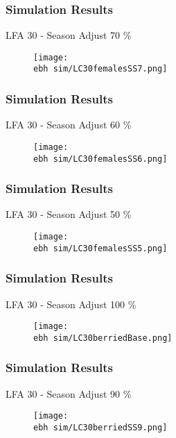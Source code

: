 \documentclass{beamer}
\newcommand{\ebh}{\string~/bio.data/bio.lobster/figures/LFA2733Framework2018/} %
\begin{document}
\begin{frame}
\frametitle{Simulation Results}
LFA 30 - Season Adjust 70 \%
\begin{figure}
        \begin{center}
            \texttt{[image: \\ebh sim/LC30femalesSS7.png]}
        \end{center}
    \end{figure}
\end{frame}


\begin{frame}
\frametitle{Simulation Results}
LFA 30 - Season Adjust 60 \%
\begin{figure}
        \begin{center}
            \texttt{[image: \\ebh sim/LC30femalesSS6.png]}
        \end{center}
    \end{figure}
\end{frame}


\begin{frame}
\frametitle{Simulation Results}
LFA 30 - Season Adjust 50 \%
\begin{figure}
        \begin{center}
            \texttt{[image: \\ebh sim/LC30femalesSS5.png]}
        \end{center}
    \end{figure}
\end{frame}






\begin{frame}
\frametitle{Simulation Results}
LFA 30 - Season Adjust 100 \%
\begin{figure}
        \begin{center}
            \texttt{[image: \\ebh sim/LC30berriedBase.png]}
        \end{center}
    \end{figure}
\end{frame}


\begin{frame}
\frametitle{Simulation Results}
LFA 30 - Season Adjust 90 \%
\begin{figure}
        \begin{center}
            \texttt{[image: \\ebh sim/LC30berriedSS9.png]}
        \end{center}
    \end{figure}
\end{frame}
\end{document}
